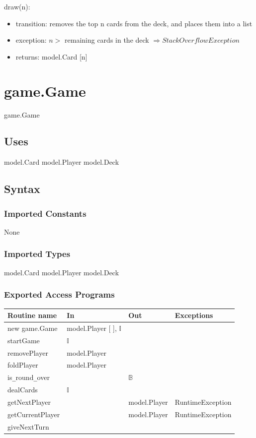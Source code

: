 \documentclass[12pt, titlepage]{article}
\begin{document}
\noindent draw(n):
\begin{itemize}
\item transition: removes the top n cards from the deck, and places them into a list 
\item exception: $n >$ remaining cards in the deck $\Longrightarrow StackOverflowException$
\item returns: model.Card [n]
\end{itemize}

\section*{game.Game}

game.Game

\subsection* {Uses}

model.Card
model.Player
model.Deck

\subsection* {Syntax}

\subsubsection* {Imported Constants}

None

\subsubsection* {Imported Types}

model.Card
model.Player
model.Deck

\subsubsection* {Exported Access Programs}

\begin{tabular}{| l | l | l | p{5cm} |}
\hline
\textbf{Routine name} & \textbf{In} & \textbf{Out} & \textbf{Exceptions}\\
\hline
new game.Game & model.Player [ ], $\mathbb{I}$ & &\\
\hline
startGame & $\mathbb{I}$ & &\\
\hline 
removePlayer & model.Player & &\\
\hline 
foldPlayer & model.Player & &\\
\hline 
is\verb|_|round\verb|_|over & & $\mathbb{B}$ &\\
\hline 
dealCards & $\mathbb{I}$ & &\\
\hline
getNextPlayer & & model.Player & RuntimeException\\
\hline 
getCurrentPlayer & & model.Player & RuntimeException\\
\hline 
giveNextTurn & & &\\
\hline
\end{tabular}
\end{document}
